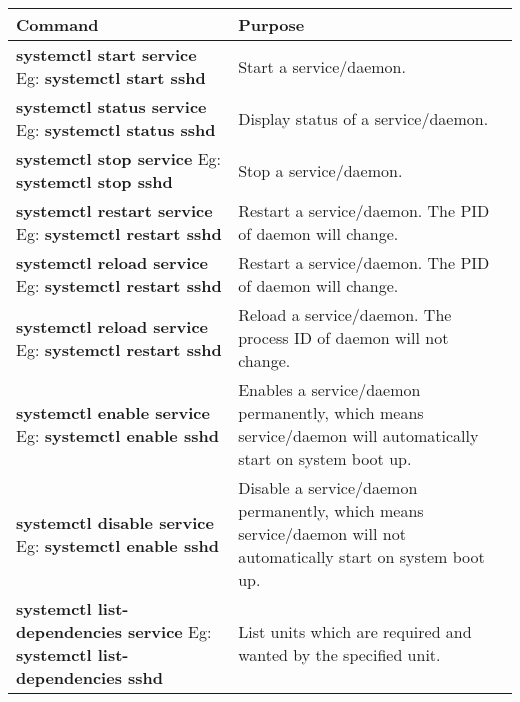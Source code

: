 \setlength{\columnsep}{20pt}
\begin{flushleft}



	\begin{tabulary}{1.0\textwidth}{|p{13em}|p{13em}|}
			\toprule
			\textbf{Command} & \textbf{Purpose}\\
			\midrule
			\textbf{systemctl start service} \newline \bigskip Eg: \color{blue} \textbf{systemctl start sshd}  & Start a service/daemon. \\
			\hline
			\textbf{systemctl status service} \newline \bigskip Eg: \color{blue} \textbf{systemctl status sshd}  & Display status of a service/daemon. \\
			\hline
			\textbf{systemctl stop service} \newline \bigskip Eg: \color{blue} \textbf{systemctl stop sshd}  & Stop a service/daemon. \\
			\hline
			\textbf{systemctl restart service} \newline \bigskip Eg: \color{blue} \textbf{systemctl restart sshd}  & Restart a service/daemon.  The PID of daemon will change.	\\
			\hline
			\textbf{systemctl reload service} \newline \bigskip Eg: \color{blue} \textbf{systemctl restart sshd}  & Restart a service/daemon.  The PID of daemon will change.	\\
			\hline
			\textbf{systemctl reload service} \newline \bigskip Eg: \color{blue} \textbf{systemctl restart sshd}  & Reload a service/daemon. The process ID of daemon will not change.	 \\
			\hline
			\textbf{systemctl enable service} \newline \bigskip Eg: \color{blue} \textbf{systemctl enable sshd}  & Enables a service/daemon permanently, which means service/daemon will automatically start on system boot up. \\
			\hline
			\textbf{systemctl disable service} \newline \bigskip Eg: \color{blue} \textbf{systemctl enable sshd}  & Disable a service/daemon permanently, which means service/daemon will not automatically start on system boot up. \\
			\hline
			\textbf{systemctl list-dependencies service} \newline \bigskip Eg: \color{blue} \textbf{systemctl list-dependencies sshd}  & List units which are required and wanted by
			the specified unit. \\
			\bottomrule
	\end{tabulary}




\end{flushleft}

\newpage


